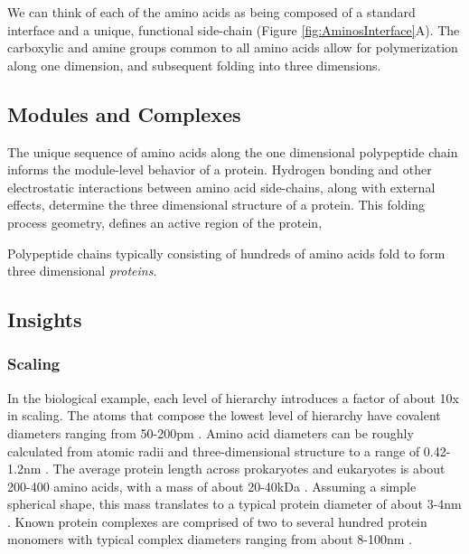 {We can think of each of the amino acids as being composed of a standard interface and a unique, functional side-chain (Figure \ref{fig:AminosInterface}A).  The carboxylic and amine groups common to all amino acids allow for polymerization along one dimension, and subsequent folding into three dimensions.  

 \subsection{Modules and Complexes}

The unique sequence of amino acids along the one dimensional polypeptide chain informs the module-level behavior of a protein.
Hydrogen bonding and other electrostatic interactions between amino acid side-chains, along with external effects, determine the three dimensional structure of a protein.
This folding process geometry, defines an active region of the protein, 


Polypeptide chains typically consisting of hundreds of amino acids fold to form three dimensional \textit{proteins}.

\subsection{Insights}

\subsubsection{Scaling}

In the biological example, each level of hierarchy introduces a factor of about 10x in scaling.  The atoms that compose the lowest level of hierarchy have covalent diameters ranging from 50-200pm \cite{Slater1993}.  Amino acid diameters can be roughly calculated from atomic radii and three-dimensional structure to a range of 0.42-1.2nm \cite{Pool2003}.  The average protein length across prokaryotes and eukaryotes is about 200-400 amino acids, with a mass of about 20-40kDa \cite{Brocchieri2005}.  Assuming a simple spherical shape, this mass translates to a typical protein diameter of about 3-4nm \cite{Erickson2009}.  Known protein complexes are comprised of two to several hundred protein monomers with typical complex diameters ranging from about 8-100nm \cite{Yang2010a}.

%

}
